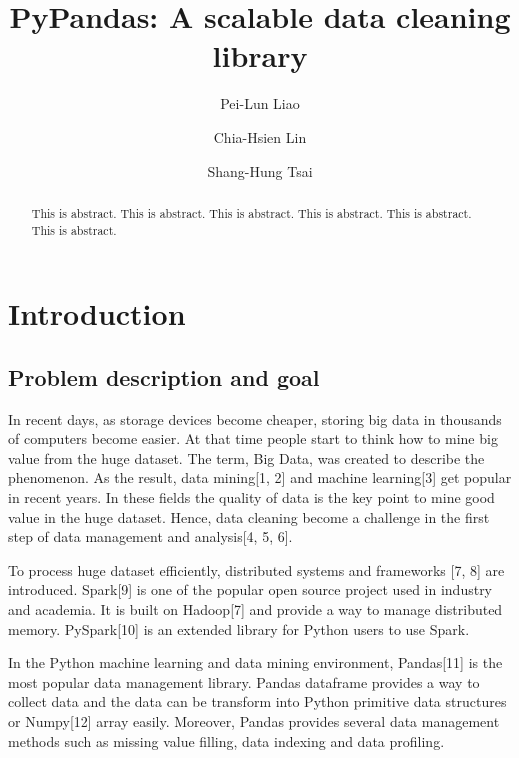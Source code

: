 \documentclass[sigconf]{acmart}
\begin{document}
\title{PyPandas: A scalable data cleaning library}

\author{Pei-Lun Liao}

\author{Chia-Hsien Lin}

\author{Shang-Hung Tsai}

\begin{abstract}
This is abstract. 
This is abstract. 
This is abstract. 
This is abstract.
This is abstract.
This is abstract.

\end{abstract}

\maketitle

\section{Introduction}

\subsection{Problem description and goal}
	In recent days, as storage devices become cheaper, storing big data in thousands of computers become easier. At that time people start to think how to mine big value from the huge dataset. The term, Big Data, was created to describe the phenomenon. As the result, data mining[1, 2] and machine learning[3] get popular in recent years. In these fields the quality of data is the key point to mine good value in the huge dataset. Hence, data cleaning become a challenge in the first step of data management and analysis[4, 5, 6].
	
	To process huge dataset efficiently, distributed systems and frameworks [7, 8] are introduced. Spark[9] is one of the popular open source project used in industry and academia. It is built on Hadoop[7] and provide a way to manage distributed memory. PySpark[10] is an extended library for Python users to use Spark.
	
	In the Python machine learning and data mining environment, Pandas[11] is the most popular data management library. Pandas dataframe provides a way to collect data and the data can be transform into Python primitive data structures or Numpy[12] array easily. Moreover, Pandas provides several data management methods such as missing value filling, data indexing and data profiling. 
	
\end{document}
